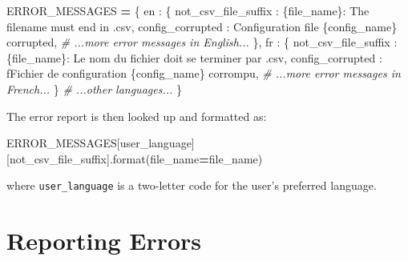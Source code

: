 \documentclass[
]{krantz}
\makeatletter
\newenvironment{Shaded}{\begin{snugshade}}{\end{snugshade}}
\newcommand{\BuiltInTok}[1]{#1}
\newcommand{\CommentTok}[1]{\textcolor[rgb]{0.56,0.35,0.01}{\textit{#1}}}
\newcommand{\NormalTok}[1]{#1}
\newcommand{\OperatorTok}[1]{\textcolor[rgb]{0.81,0.36,0.00}{\textbf{#1}}}
\newcommand{\SpecialCharTok}[1]{\textcolor[rgb]{0.00,0.00,0.00}{#1}}
\newcommand{\SpecialStringTok}[1]{\textcolor[rgb]{0.31,0.60,0.02}{#1}}
\newcommand{\StringTok}[1]{\textcolor[rgb]{0.31,0.60,0.02}{#1}}
\newenvironment{kframe}{%
\medskip{}
\setlength{\fboxsep}{.8em}
 \def\at@end@of@kframe{}%
 \ifinner\ifhmode%
  \def\at@end@of@kframe{\end{minipage}}%
  \begin{minipage}{\columnwidth}%
 \fi\fi%
 \def\FrameCommand##1{\hskip\@totalleftmargin \hskip-\fboxsep
 \colorbox{shadecolor}{##1}\hskip-\fboxsep
     \hskip-\linewidth \hskip-\@totalleftmargin \hskip\columnwidth}%
 \MakeFramed {\advance\hsize-\width
   \@totalleftmargin\z@ \linewidth\hsize
   \@setminipage}}%
 {\par\unskip\endMakeFramed%
 \at@end@of@kframe}
\renewenvironment{Shaded}{\begin{kframe}}{\end{kframe}}
\makeatother
\begin{document}
\begin{Shaded}
\begin{Highlighting}[]
\NormalTok{ERROR\_MESSAGES }\OperatorTok{=}\NormalTok{ \{}
    \StringTok{\textquotesingle{}en\textquotesingle{}}\NormalTok{ : \{}
        \StringTok{\textquotesingle{}not\_csv\_file\_suffix\textquotesingle{}}\NormalTok{ : }\StringTok{\textquotesingle{}}\SpecialCharTok{\{file\_name\}}\StringTok{: The filename must end in \textasciigrave{}.csv\textasciigrave{}\textquotesingle{}}\NormalTok{,}
        \StringTok{\textquotesingle{}config\_corrupted\textquotesingle{}}\NormalTok{ : }\StringTok{\textquotesingle{}Configuration file }\SpecialCharTok{\{config\_name\}}\StringTok{ corrupted\textquotesingle{}}\NormalTok{,}
        \CommentTok{\# ...more error messages in English...}
\NormalTok{    \},}
    \StringTok{\textquotesingle{}fr\textquotesingle{}}\NormalTok{ : \{}
        \StringTok{\textquotesingle{}not\_csv\_file\_suffix\textquotesingle{}}\NormalTok{ : }\StringTok{\textquotesingle{}}\SpecialCharTok{\{file\_name\}}\StringTok{: Le nom du fichier doit se terminer par \textasciigrave{}.csv\textasciigrave{}\textquotesingle{}}\NormalTok{,}
        \StringTok{\textquotesingle{}config\_corrupted\textquotesingle{}}\NormalTok{ : }\SpecialStringTok{f\textquotesingle{}Fichier de configuration }\SpecialCharTok{\{}\NormalTok{config\_name}\SpecialCharTok{\}}\SpecialStringTok{ corrompu\textquotesingle{}}\NormalTok{,}
        \CommentTok{\# ...more error messages in French...}
\NormalTok{    \}}
    \CommentTok{\# ...other languages...}
\NormalTok{\}}
\end{Highlighting}
\end{Shaded}

The error report is then looked up and formatted as:

\begin{Shaded}
\begin{Highlighting}[]
\NormalTok{ERROR\_MESSAGES[user\_language][}\StringTok{\textquotesingle{}not\_csv\_file\_suffix\textquotesingle{}}\NormalTok{].}\BuiltInTok{format}\NormalTok{(file\_name}\OperatorTok{=}\NormalTok{file\_name)}
\end{Highlighting}
\end{Shaded}

where \texttt{user\_language} is a two-letter code for the user's preferred language.

\hypertarget{errors-logging}{%
\section{Reporting Errors}\label{errors-logging}}
\end{document}
